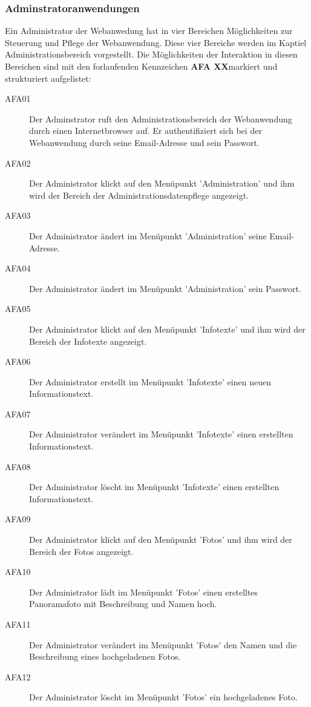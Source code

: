 \subsubsection{Adminstratoranwendungen}
\label{sec:Adminstratoranwendungen}

Ein Administrator der Webanwedung hat in vier Bereichen Möglichkeiten zur Steuerung und Pflege der Webanwendung. Diese vier Bereiche werden im Kaptiel Administrationsbereich vorgestellt. Die Möglichkeiten der Interaktion in diesen Bereichen sind mit den forlaufenden Kennzeichen \textbf{AFA XX}\footnotemark markiert und strukturiert aufgelistet:


\begin{description}
  \item[AFA01] Der Adminstrator ruft den Administrationsbereich der Webanwendung durch einen Internetbrowser auf. Er authentifiziert sich bei der Webanwendung durch seine Email-Adresse und sein Passwort.
  \item[AFA02] Der Administrator klickt auf den Menüpunkt 'Administration' und ihm wird der Bereich der Administrationsdatenpflege angezeigt.
  \item[AFA03] Der Administrator ändert im Menüpunkt 'Administration' seine Email-Adresse.
  \item[AFA04] Der Administrator ändert im Menüpunkt 'Administration' sein Passwort.
  \item[AFA05] Der Administrator klickt auf den Menüpunkt 'Infotexte' und ihm wird der Bereich der Infotexte angezeigt.
  \item[AFA06] Der Administrator erstellt im Menüpunkt 'Infotexte' einen neuen Informationstext.
  \item[AFA07] Der Administrator verändert im Menüpunkt 'Infotexte' einen erstellten Informationstext.
  \item[AFA08] Der Administrator löscht im Menüpunkt 'Infotexte' einen erstellten Informationstext.
  \item[AFA09] Der Administrator klickt auf den Menüpunkt 'Fotos' und ihm wird der Bereich der Fotos angezeigt.
  \item[AFA10] Der Administrator lädt im Menüpunkt 'Fotos' einen erstelltes Panoramafoto mit Beschreibung und Namen hoch.
  \item[AFA11] Der Administrator verändert im Menüpunkt 'Fotos' den Namen und die Beschreibung eines hochgeladenen Fotos.
  \item[AFA12] Der Administrator löscht im Menüpunkt 'Fotos' ein hochgeladenes Foto.

\end{description}
